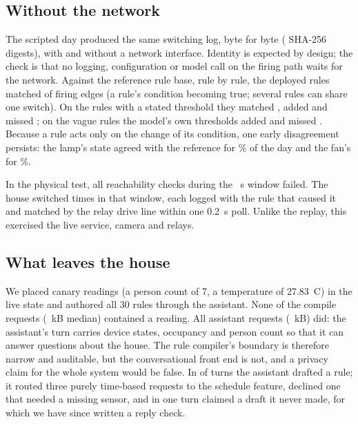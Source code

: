 \documentclass[conference]{IEEEtran}
\begin{document}
\subsection{Without the network}\label{sec:offline}

The scripted day produced the same switching log, byte for byte (\replaySameHash{}
SHA-256 digests), with and without a network interface. Identity is expected by
design; the check is that no logging, configuration or model call on the
firing path waits for the network. Against the reference
rule base, rule by rule, the deployed rules matched \replayAllMatched{} of
\replayAllRef{} firing edges (a rule's condition becoming true; several rules
can share one switch). On the \replayStatedRules{} rules with a stated
threshold they matched \replayStatedMatched{}, added \replayStatedFalse{} and
missed \replayStatedMissed{}; on the vague rules the model's own thresholds
added \replayVagueFalse{} and missed \replayVagueMissed{}. Because a rule acts only on the
change of its condition, one early disagreement persists: the lamp's state
agreed with the reference for \replayLampAgree\% of the day and the fan's for
\replayFanAgree\%.

In the physical test, all \offChecks{} reachability checks during the
\offSeconds~s window failed. The house switched \offSwitches{} times in that
window, each logged with the rule that caused it and matched by the relay drive
line within one 0.2~s poll. Unlike the replay, this exercised the live service,
camera and relays.

\subsection{What leaves the house}\label{sec:egress}
We placed canary readings (a person count of 7, a temperature of 27.83~\textdegree C)
in the live state and authored all 30 rules through the assistant. None of the
\egCompileReq{} compile requests (\egCompileKb~kB median) contained a reading.
All \egAgentReq{} assistant requests (\egAgentKb~kB) did: the assistant's turn
carries device states, occupancy and person count so that it can answer
questions about the house. The rule compiler's boundary is therefore narrow and
auditable, but the conversational front end is not, and a privacy claim for
the whole system would be false. In \egProposals{} of \egTurns{} turns the
assistant drafted a rule; it routed three purely time-based requests to the
schedule feature, declined one that needed a missing sensor, and in one turn
claimed a draft it never made, for which we have since written a reply check.
\end{document}
